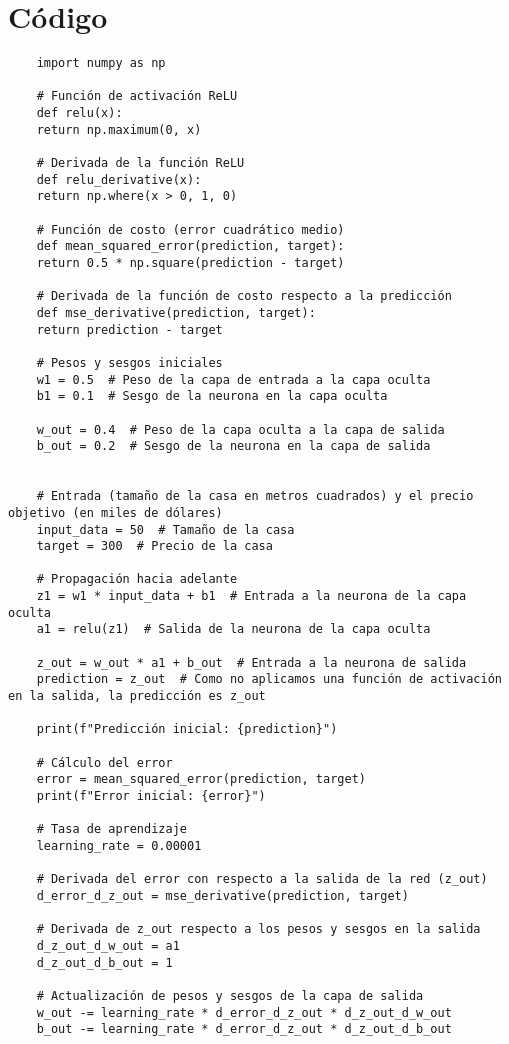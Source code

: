 \documentclass{article}
\begin{document}
\section{Código}
\begin{verbatim}
	import numpy as np
	
	# Función de activación ReLU
	def relu(x):
	return np.maximum(0, x)
	
	# Derivada de la función ReLU
	def relu_derivative(x):
	return np.where(x > 0, 1, 0)
	
	# Función de costo (error cuadrático medio)
	def mean_squared_error(prediction, target):
	return 0.5 * np.square(prediction - target)
	
	# Derivada de la función de costo respecto a la predicción
	def mse_derivative(prediction, target):
	return prediction - target
	
	# Pesos y sesgos iniciales
	w1 = 0.5  # Peso de la capa de entrada a la capa oculta
	b1 = 0.1  # Sesgo de la neurona en la capa oculta
	
	w_out = 0.4  # Peso de la capa oculta a la capa de salida
	b_out = 0.2  # Sesgo de la neurona en la capa de salida
	
	
	# Entrada (tamaño de la casa en metros cuadrados) y el precio objetivo (en miles de dólares)
	input_data = 50  # Tamaño de la casa
	target = 300  # Precio de la casa
	
	# Propagación hacia adelante
	z1 = w1 * input_data + b1  # Entrada a la neurona de la capa oculta
	a1 = relu(z1)  # Salida de la neurona de la capa oculta
	
	z_out = w_out * a1 + b_out  # Entrada a la neurona de salida
	prediction = z_out  # Como no aplicamos una función de activación en la salida, la predicción es z_out
	
	print(f"Predicción inicial: {prediction}")
	
	# Cálculo del error
	error = mean_squared_error(prediction, target)
	print(f"Error inicial: {error}")
	
	# Tasa de aprendizaje
	learning_rate = 0.00001
	
	# Derivada del error con respecto a la salida de la red (z_out)
	d_error_d_z_out = mse_derivative(prediction, target)
	
	# Derivada de z_out respecto a los pesos y sesgos en la salida
	d_z_out_d_w_out = a1
	d_z_out_d_b_out = 1
	
	# Actualización de pesos y sesgos de la capa de salida
	w_out -= learning_rate * d_error_d_z_out * d_z_out_d_w_out
	b_out -= learning_rate * d_error_d_z_out * d_z_out_d_b_out
	

\end{verbatim}
\end{document}
